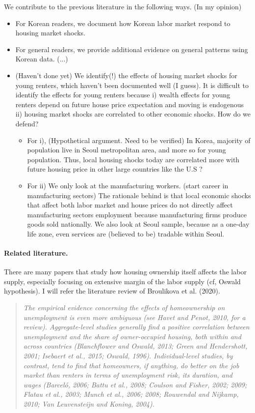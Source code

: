\documentclass[10pt]{article}
\theoremstyle{definition}
\theoremstyle{remark}
\begin{document}
We contribute to the previous literature in the following ways. (In my opinion) 
\begin{itemize}
	\item For Korean readers, we document how Korean labor market respond to housing market shocks.  
	\item For general readers, we provide additional evidence on general patterns using Korean data. (...)
	\item (Haven't done yet) We identify(!) the effects of housing market shocks for young renters, which haven't been documented well (I guess). It is difficult to identify the effects for young renters because i) wealth effects for young renters depend on future house price expectation and moving is endogenous ii) housing market shocks are correlated to other economic shocks. How do we defend?
	\begin{itemize}
		\item For i), (Hypothetical argument. Need to be verified) In Korea, majority of population live in Seoul metropolitan area, and more so for young population. Thus, local housing shocks today are correlated more with future housing price in other large countries like the U.S ?  
		\item For ii) We only look at the manufacturing workers. (start career in manufacturing sectors) The rationale behind is that local economic shocks that affect both labor market and house prices do not directly affect manufacturing sectors employment because manufacturing firms produce goods sold nationally. We also look at Seoul sample, because as a one-day life zone, even services are (believed to be) tradable within Seoul. 
	\end{itemize} 
\end{itemize}

\paragraph{Related literature.} There are many papers that study how housing ownership itself affects the labor supply, especially focusing on extensive margin of the labor supply (cf, Oswald hypothesis). I will refer the literature review of Broulikova et al. (2020).

\begin{quote}
    \textit{The empirical evidence concerning the effects of homeownership on unemployment is even more ambiguous (see Havet and Penot, 2010, for a review). Aggregate-level studies generally find a positive correlation between unemployment and the share of owner-occupied housing, both within and across countries (Blanchflower and Oswald, 2013; Green and Hendershott, 2001; Isebaert et al., 2015; Oswald, 1996). Individual-level studies, by contrast, tend to find that homeowners, if anything, do better on the job market than renters in terms of unemployment risk, its duration, and wages (Barceló, 2006; Battu et al., 2008; Coulson and Fisher, 2002; 2009; Flatau et al., 2003; Munch et al., 2006; 2008; Rouwendal and Nijkamp, 2010; Van Leuvensteijn and Koning, 2004).}
\end{quote}
\end{document}
